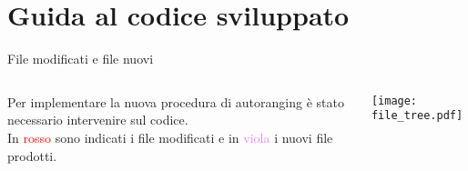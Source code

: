 \section{Guida al codice sviluppato}
\begin{frame}{File modificati e file nuovi}
  \begin{columns}
    \begin{column}{0.7\textwidth}
      Per implementare la \alert{nuova} procedura di autoranging
      è stato necessario intervenire sul codice.\\
      In \textcolor{red}{rosso} sono indicati i file modificati e in
      \textcolor{violet}{viola} i nuovi file prodotti.
    \end{column}
    \begin{column}{0.3\textwidth}
      \centering
      \texttt{[image: file\_tree.pdf]}
    \end{column}
  \end{columns}

\end{frame}
